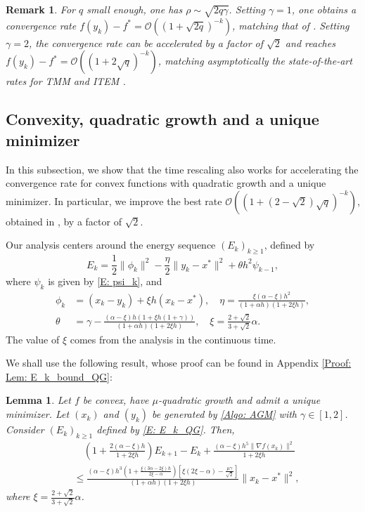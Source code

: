 \documentclass[pdflatex,sn-mathphys-num]{sn-jnl}
\theoremstyle{thmstyleone}
\newtheorem{lemma}[theorem]{Lemma}
\theoremstyle{thmstyletwo}
\newtheorem{remark}{Remark}
\theoremstyle{thmstylethree}
\begin{document}
\begin{remark}
For $q$ small enough, one has $\rho\sim \sqrt{2q\gamma}$. Setting $\gamma=1$, one obtains a convergence rate $f(y_k)-f^*=\mathcal{O}\left( (1+\sqrt{2q})^{-k} \right)$, matching that of \cite{Aujol_2022}. Setting $\gamma=2$, the convergence rate can be accelerated by a factor of $\sqrt{2}$ and reaches $f(y_k)-f^*=\mathcal{O}\left( (1+2\sqrt{q})^{-k} \right)$, matching asymptotically the state-of-the-art rates for TMM \cite{Scoy_2018} and ITEM \cite{Taylor_2023_optimal}.    
\end{remark}





\subsection{Convexity, quadratic growth and a unique minimizer}\label{SS:Algorithms_QG}
In this subsection, we show that the time rescaling also works for accelerating the convergence rate for convex functions with quadratic growth and a unique minimizer. In particular, we improve the best rate $\mathcal{O}\left( (1+(2-\sqrt{2})\sqrt{q})^{-k} \right)$, obtained in \cite{Aujol_2023}, by a factor of $\sqrt{2}$.

Our analysis centers around the energy sequence $(E_k)_{k\ge 1}$, defined by
\begin{equation}\label{E: E_k_QG}
E_k = \frac{1}{2}\| \phi_k \|^2 - \frac{\eta}{2}\| y_k-x^* \|^2 + \theta h^2 \psi_{k-1},
\end{equation}
where $\psi_k$ is given by \eqref{E: psi_k}, and
\begin{align*}
\phi_k &= (x_k-y_k) + \xi h(x_k-x^*),
\quad \eta = \frac{\xi(\alpha-\xi) h^2}{(1+\alpha h)(1+2\xi h)},\\
\theta &= \gamma - \frac{(\alpha-\xi)h \left( 1 + \xi h (1+\gamma) \right) }{(1+\alpha h)( 1+2\xi h )},\quad \xi = \frac{2+\sqrt{2}}{3+\sqrt{2}}\alpha.
\end{align*}
The value of $\xi$ comes from the analysis in the continuous time.

We shall use the following result, whose proof can be found in Appendix \ref{Proof: Lem: E_k_bound_QG}:

\begin{lemma}\label{Lem: E_k_bound_QG}
Let $f$ be convex, have $\mu$-quadratic growth and admit a unique minimizer. Let $(x_k)$ and $(y_k)$ be generated by \eqref{Algo: AGM} with $\gamma\in[1, 2]$. Consider $(E_k)_{k\ge 1}$ defined by \eqref{E: E_k_QG}. Then, 
\begin{align*}
&\quad \left( 1 + \frac{ 2(\alpha-\xi) h }{1+2\xi h} \right)E_{k+1} - E_k
 + \frac{ (\alpha-\xi) h^5 \| \nabla f(x_k) \|^2 }{ 1 + 2\xi h } \\
&\le \frac{ (\alpha-\xi) h^3 \left( 1 + \frac{\xi(3\alpha-2\xi)h}{2\xi-\alpha} \right) \left[ \xi(2\xi-\alpha) - \frac{\mu\gamma}{\sqrt{2}} \right]}{(1+\alpha h)\left(1+2\xi h\right)}\| x_k - x^* \|^2,
\end{align*}
where $\xi = \frac{2+\sqrt{2}}{3+\sqrt{2}}\alpha$. 
\end{lemma} 
\end{document}
